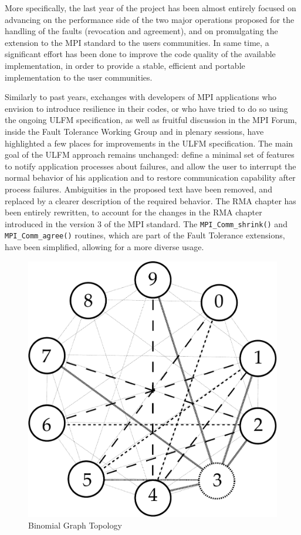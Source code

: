 More specifically, the last year of the project has been almost
entirely focused on advancing on the performance side of the two major
operations proposed for the handling of the faults (revocation and
agreement), and on promulgating the extension to the MPI standard to
the users communities. In same time, a significant effort has been
done to improve the code quality of the available implementation, in
order to provide a stable, efficient and portable implementation to
the user communities.

Similarly to past years, exchanges with developers of MPI applications
who envision to introduce resilience in their codes, or who have tried
to do so using the ongoing ULFM specification, as well as fruitful
discussion in the MPI Forum, inside the Fault Tolerance Working Group
and in plenary sessions, have highlighted a few places for
improvements in the ULFM specification. The main goal of the ULFM
approach remains unchanged: define a minimal set of features to notify
application processes about failures, and allow the user to interrupt
the normal behavior of his application and to restore communication
capability after process failures. Ambiguities in the proposed text
have been removed, and replaced by a clearer description of the
required behavior. The RMA chapter has been entirely rewritten, to
account for the changes in the RMA chapter introduced in the version 3
of the MPI standard. The {\tt MPI\_Comm\_shrink()} and {\tt
MPI\_Comm\_agree()} routines, which are part of the Fault Tolerance
extensions, have been simplified, allowing for a more diverse usage.

\begin{figure}[ht]
\begin{center}
\includegraphics[width=0.4\columnwidth]{Figs/BinomialGraph.pdf}
  \caption{Binomial Graph Topology}
  \label{fig:binomial-graph}
\end{center}
\end{figure}

